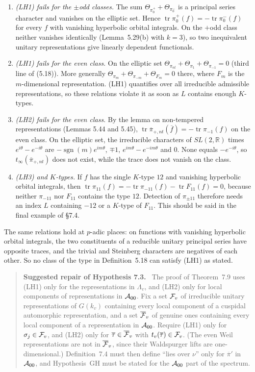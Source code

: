 \documentclass[12pt,letterpaper]{article}
\newcommand{\tr}{\operatorname{tr}}
\DeclareMathOperator{\sgn}{sgn}
\newcommand{\R}{\mathbb{R}}
\newcommand{\ov}[1]{\overline{#1}}
\theoremstyle{plain}
\newenvironment{fix}[1][Suggested text]%
  {\begin{quote}\small\noindent\textbf{#1.}\ }%
  {\end{quote}}
\begin{document}
\begin{enumerate}
\item \emph{(LH1) fails for the $\pm$odd classes.} The sum
$\Theta_{\pi_0^+}+\Theta_{\pi_0^-}$ is a principal series character and
vanishes on the elliptic set. Hence
$\tr\pi_0^+(f)=-\tr\pi_0^-(f)$ for every $f$ with vanishing hyperbolic
orbital integrals. On the $+$odd class neither vanishes identically
(Lemma~5.29(b) with $k=3$), so two inequivalent unitary representations
give linearly dependent functionals.
\item \emph{(LH1) fails for the even class.} On the elliptic set
$\Theta_{\pi_{nt}}+\Theta_{\pi_1}+\Theta_{\pi_{-1}}=0$ (third line of
(5.18)). More generally
$\Theta_{\pi_m}+\Theta_{\pi_{-m}}+\Theta_{F_m}=0$ there, where $F_m$ is the
$m$-dimensional representation. (LH1) quantifies over all irreducible
admissible representations, so these relations violate it as soon as $L$
contains enough $K$-types.
\item \emph{(LH2) fails for the even class.} By the lemma on non-tempered
representations (Lemmas 5.44 and 5.45),
$\tr\ov\pi_{+,nt}(\ov f)=-\tr\pi_{-1}(f)$ on the even class. On the
elliptic set, the irreducible characters of $SL(2,\R)$ times
$e^{i\theta}-e^{-i\theta}$ are $-\sgn(m)e^{im\theta}$, $\mp1$,
$e^{im\theta}-e^{-im\theta}$ and $0$. None equals $-e^{-i\theta}$, so
$t_\infty(\ov\pi_{+,nt})$ does not exist, while the trace does not vanish
on the class.
\item \emph{(LH3) and $K$-types.} If $f$ has the single $K$-type $12$ and
vanishing hyperbolic orbital integrals, then
$\tr\pi_{11}(f)=-\tr\pi_{-11}(f)-\tr F_{11}(f)=0$, because neither
$\pi_{-11}$ nor $F_{11}$ contains the type $12$. Detection of
$\pi_{\pm11}$ therefore needs an index $L$ containing $-12$ or a $K$-type
of $F_{11}$. This should be said in the final example of \S7.4.
\end{enumerate}

The same relations hold at $p$-adic places: on functions with vanishing
hyperbolic orbital integrals, the two constituents of a reducible unitary
principal series have opposite traces, and the trivial and Steinberg
characters are negatives of each other. So no class of the type in
Definition~5.18 can satisfy (LH1) as stated.

\begin{fix}[Suggested repair of Hypothesis 7.3]
The proof of Theorem~7.9 uses (LH1) only for the representations in
$\Lambda_v$, and (LH2) only for local components of representations in
${\cal A}_{00}$. Fix a set ${\cal F}_v$ of irreducible unitary
representations of $G(k_v)$ containing every local component of a cuspidal
automorphic representation, and a set $\ov{\cal F}_v$ of genuine ones
containing every local component of a representation in ${\cal A}_{00}$.
Require (LH1) only for $\sigma_j\in{\cal F}_v$, and (LH2) only for
$\ov\tau\in\ov{\cal F}_v$ with $t_v(\ov\tau)\in{\cal F}_v$. (The even Weil
representations are not in $\ov{\cal F}_v$, since their Waldspurger lifts
are one-dimensional.) Definition~7.4 must then define ``lies over $\nu$''
only for $\ov\pi'$ in ${\cal A}_{00}$, and Hypothesis~GH must be stated
for the ${\cal A}_{00}$ part of the spectrum.
\end{fix}
\end{document}
